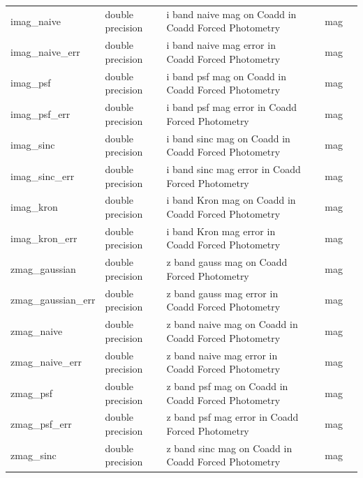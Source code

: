 \documentclass[12pt]{article}
\begin{document}
\begin{table}[thbp]
\begin{center}
{\begin{tabular}{llllll}
imag\_naive & double precision & i band naive mag on Coadd in Coadd Forced Photometry         &                            & mag            &   \\
imag\_naive\_err & double precision & i band naive mag error in Coadd Forced Photometry        &                            & mag            &   \\
imag\_psf & double precision & i band psf mag on Coadd in Coadd Forced Photometry         &                            & mag            &  \\
imag\_psf\_err & double precision & i band psf mag error in Coadd Forced Photometry        &                            & mag            &   \\
imag\_sinc & double precision & i band sinc mag on Coadd in Coadd Forced Photometry         &                            & mag            &  \\
imag\_sinc\_err & double precision & i band sinc mag error in Coadd Forced Photometry        &                            & mag            &   \\
imag\_kron & double precision & i band Kron mag on Coadd in Coadd Forced Photometry         &                            & mag            &  \\
imag\_kron\_err & double precision & i band Kron mag error in Coadd Forced Photometry        &                            & mag            &   \\
zmag\_gaussian & double precision & z band gauss mag on Coadd Forced Photometry               &                            & mag            &   \\
zmag\_gaussian\_err & double precision & z band gauss mag error in Coadd Forced Photometry     &                            & mag            &   \\
zmag\_naive & double precision & z band naive mag on Coadd in Coadd Forced Photometry         &                            & mag            &   \\
zmag\_naive\_err & double precision & z band naive mag error in Coadd Forced Photometry        &                            & mag            &   \\
zmag\_psf & double precision & z band psf mag on Coadd in Coadd Forced Photometry         &                            & mag            &  \\
zmag\_psf\_err & double precision & z band psf mag error in Coadd Forced Photometry        &                            & mag            &   \\
zmag\_sinc & double precision & z band sinc mag on Coadd in Coadd Forced Photometry         &                            & mag            &  \\

\end{tabular}}
\end{center}
\end{table}
\end{document}
